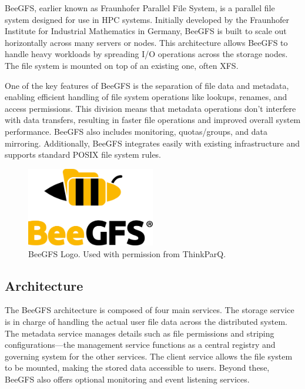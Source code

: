BeeGFS, earlier known as Fraunhofer Parallel File System, is a parallel file system designed for use in HPC systems. Initially developed by the Fraunhofer Institute for Industrial Mathematics in Germany, BeeGFS is built to scale out horizontally across many servers or nodes. This architecture allows BeeGFS to handle heavy workloads by spreading I/O operations across the storage nodes. The file system is mounted on top of an existing one, often XFS.

One of the key features of BeeGFS is the separation of file data and metadata, enabling efficient handling of file system operations like lookups, renames, and access permissions. This division means that metadata operations don’t interfere with data transfers, resulting in faster file operations and improved overall system performance. BeeGFS also includes monitoring, quotas/groups, and data mirroring. Additionally, BeeGFS integrates easily with existing infrastructure and supports standard POSIX file system rules.

\begin{figure}[h]
    \centering
    \includegraphics[width=0.5\textwidth]{fig/img/BeeGFS_big.png}
    \caption[BeeGFS Logo]{BeeGFS Logo. Used with permission from ThinkParQ.}
    \label{fig:beegfs_logo}
\end{figure}

\subsection{Architecture}

The BeeGFS architecture is composed of four main services. The storage service is in charge of handling the actual user file data across the distributed system. The metadata service manages details such as file permissions and striping configurations—the management service functions as a central registry and governing system for the other services. The client service allows the file system to be mounted, making the stored data accessible to users. Beyond these, BeeGFS also offers optional monitoring and event listening services.


